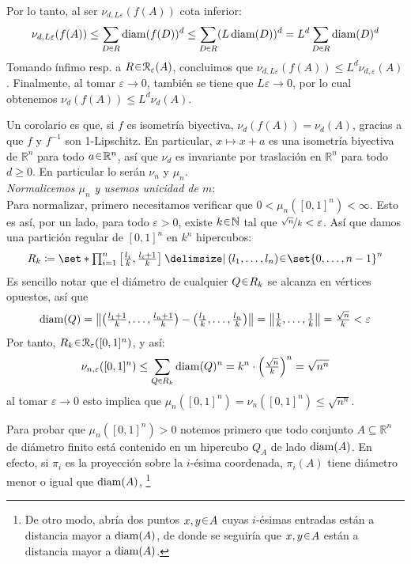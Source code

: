 \begin{sol}
\begin{enumerate}[label = (\roman*), leftmargin=1.5em]
Por lo tanto, al ser $\nu_{d, L\varepsilon}(f(A))$ cota inferior:
\[
\nu_{d, L\varepsilon}(f(A)) 
\leq \sum_{D\en R}\diam(f(D))^d
\leq \sum_{D\en R}(L \diam(D))^d
= L^d \sum_{D\en R}\diam(D)^d
\]
Tomando ínfimo resp. a $R\en\mathcal{R}_{\varepsilon}(A)$, concluimos que $\nu_{d, L\varepsilon}(f(A)) \le L^d \nu_{d,\varepsilon}(A)$. Finalmente, al tomar $\varepsilon \to 0$, también se tiene que $L\varepsilon \to 0$, por lo cual obtenemos $\nu_{d}(f(A)) \le L^d \nu_{d}(A)$.\par
Un corolario es que, si $f$ es isometría biyectiva, $\nu_d(f(A)) = \nu_d(A)$, gracias a que $f$ y $f^{-1}$ son 1-Lipschitz. En particular, $x \mapsto x+a$ es una isometría biyectiva de $\mathbb{R}^n$ para todo $a\en\mathbb{R}^n$, así que $\nu_d$ es invariante por traslación en $\mathbb{R}^n$ para todo $d\ge 0$. En particular lo serán $\nu_n$ y $\mu_n$.\vspace{1em}\\
\emph{Normalicemos $\mu_n$ y usemos unicidad de $m$}:\\
Para normalizar, primero necesitamos verificar que $0 < \mu_n([0,1]^n) < \infty$. Esto es así, por un lado, para todo $\varepsilon>0$, existe $k\en\mathbb{N}$ tal que $\nicefrac{\sqrt{n}}{k} < \varepsilon$. Así que damos una partición regular de $[0,1]^n$ en $k^n$ hipercubos:
\[\textstyle
R_k\coloneq\set*{
    \prod^n_{i=1}\big[\frac{l_i}{k},\frac{l_i+1}{k}\big]
    \given
    (l_1,\dots,l_n)\en\set{0,\dots,n-1}^n
    }
\]
Es sencillo notar que el diámetro de cualquier $Q \en R_k$ se alcanza en vértices opuestos, así que
\[
\operatorname{diam}(Q) 
= \norm{\bigl(\tfrac{l_1+1}{k},\dots,\tfrac{l_n+1}{k}\bigr)-\bigl(\tfrac{l_1}{k},\dots,\tfrac{l_n}{k}\bigr)}
= \norm{\tfrac{1}{k},\dots,\tfrac{1}{k}} 
= \tfrac{\sqrt{n}}{k} < \varepsilon
\]
Por tanto, $R_k\en\mathcal{R}_\varepsilon([0,1]^n)$, y así:
\[
\nu_{n,\varepsilon}([0,1]^n) 
\leq \sum_{Q\en R_k}\diam(Q)^n = k^n \cdot \Bigl(\tfrac{\sqrt{n}}{k}\Bigr)^n = \sqrt{n^n}
\]
al tomar $\varepsilon\to 0$ esto implica que $\mu_n([0,1]^n)=\nu_n([0,1]^n) \le \sqrt{n^n}$.\par
Para probar que $\mu_n([0,1]^n) >0$ notemos primero que todo conjunto $A\subseteq\mathbb{R}^n$ de diámetro finito está contenido en un hipercubo $Q_A$ de lado $\operatorname{diam}(A)$. En efecto, si $\pi_i$ es la proyección sobre la $i$-ésima coordenada, $\pi_i(A)$ tiene diámetro menor o igual que $\operatorname{diam}(A)$,%
\footnote{
    De otro modo, abría dos puntos $x,y\en A$ cuyas $i$-ésimas entradas están a distancia mayor a $\operatorname{diam}(A)$, de donde se seguiría que $x,y\en A$ están a distancia mayor a $\operatorname{diam}(A)$.
}
\end{enumerate}
\end{sol}
